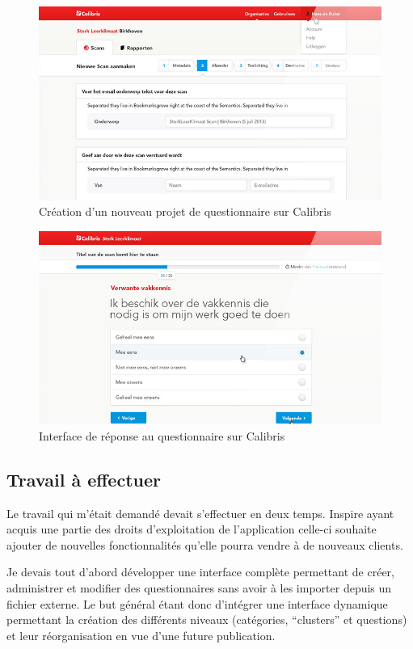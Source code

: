 \documentclass[12pt,a4paper]{book}
\begin{document}
\begin{figure}[htp]
\centering
\includegraphics[scale=0.6]{img/calibris1.png}
 \caption{Création d'un nouveau projet de questionnaire sur Calibris}
 \label{fig.calibris1}
\end{figure}

\begin{figure}[htp]
\centering
\includegraphics[scale=0.6]{img/calibris2.png}
 \caption{Interface de réponse au questionnaire sur Calibris}
 \label{fig.calibris2}
\end{figure}

\subsection{Travail à effectuer}

Le travail qui m'était demandé devait s'effectuer en deux temps. Inspire ayant acquis une partie des droits d'exploitation de l'application celle-ci souhaite ajouter de nouvelles fonctionnalités qu'elle pourra vendre à de nouveaux clients.

Je devais tout d'abord développer une interface complète permettant de créer, administrer et modifier des questionnaires sans avoir à les importer depuis un fichier externe. Le but général étant donc d'intégrer une interface dynamique permettant la création des différents niveaux (catégories, ``clusters'' et questions) et leur réorganisation en vue d'une future publication.
\end{document}
